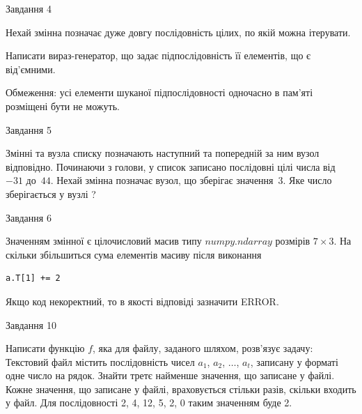 \documentclass[12pt, ukrainian]{article}
\begin{document}
{               
{\begin{center}Завдання {4}\end{center}}
\vspace{-6mm}
Нехай змінна  позначає дуже довгу послідовність цілих, по якій можна ітерувати.

Написати вираз-генератор, що задає підпослідовність її елементів, що є від'єм\-ни\-ми.

Обмеження: усі елементи шуканої підпослідовності одночасно в пам'яті розміщені бути не можуть.\par

\vspace{10mm}
               
{\begin{center}Завдання {5}\end{center}}
\vspace{-6mm}
Змінні  та  вузла списку позначають наступний та попередній за ним вузол відповідно. Починаючи з голови, у список записано послідовні цілі числа від~$-31$ до~$44$. Нехай змінна  позначає вузол, що зберігає значення~$3$.
Яке число зберігається у вузлі  ?\par

               
{\begin{center}Завдання {6}\end{center}}
\vspace{-6mm}
Значенням змінної  є цілочисловий масив типу $numpy.ndarray$ розмірів $7{\times}3$. На скільки збільшиться сума елементів масиву  після виконання
\begin{verbatim}
a.T[1] += 2
\end{verbatim}


Якщо код некоректний, то в якості відповіді зазначити ERROR.\par

               
{\begin{center}Завдання {10}\end{center}}
\vspace{-6mm}

Написати функцію $f$, яка для файлу, заданого шляхом, розв’язує задачу:\\ Текстовий файл містить послідовність чисел $a_1$, $a_2$, $\ldots$, $a_t$, записану у форматі одне число на рядок. Знайти третє найменше значення, що записане у файлі. Кожне значення, що записане у файлі, враховується стільки разів, скільки входить у файл. Для послідовності 2, 4, 12, 5, 2, 0 таким значенням буде 2.

}
\end{document}
